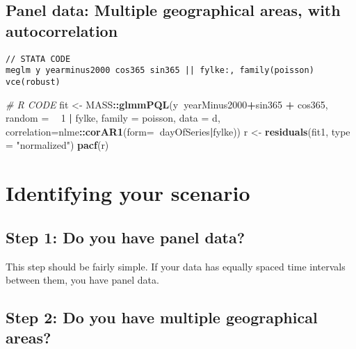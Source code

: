 \documentclass[]{book}
\newenvironment{Shaded}{\begin{snugshade}}{\end{snugshade}}
\newcommand{\KeywordTok}[1]{\textcolor[rgb]{0.13,0.29,0.53}{\textbf{#1}}}
\newcommand{\DataTypeTok}[1]{\textcolor[rgb]{0.13,0.29,0.53}{#1}}
\newcommand{\DecValTok}[1]{\textcolor[rgb]{0.00,0.00,0.81}{#1}}
\newcommand{\StringTok}[1]{\textcolor[rgb]{0.31,0.60,0.02}{#1}}
\newcommand{\CommentTok}[1]{\textcolor[rgb]{0.56,0.35,0.01}{\textit{#1}}}
\newcommand{\OperatorTok}[1]{\textcolor[rgb]{0.81,0.36,0.00}{\textbf{#1}}}
\newcommand{\NormalTok}[1]{#1}
\begin{document}
\subsection{Panel data: Multiple geographical areas, with
autocorrelation}\label{panel-data-multiple-geographical-areas-with-autocorrelation}

\begin{verbatim}
// STATA CODE
meglm y yearminus2000 cos365 sin365 || fylke:, family(poisson) vce(robust)
\end{verbatim}

\begin{Shaded}
\begin{Highlighting}[]
\CommentTok{# R CODE}
\NormalTok{fit <-}\StringTok{ }\NormalTok{MASS}\OperatorTok{::}\KeywordTok{glmmPQL}\NormalTok{(y}\OperatorTok{~}\NormalTok{yearMinus2000}\OperatorTok{+}\NormalTok{sin365 }\OperatorTok{+}\StringTok{ }\NormalTok{cos365, }\DataTypeTok{random =} \OperatorTok{~}\StringTok{ }\DecValTok{1} \OperatorTok{|}\StringTok{ }\NormalTok{fylke,}
                \DataTypeTok{family =}\NormalTok{ poisson, }\DataTypeTok{data =}\NormalTok{ d,}
                \DataTypeTok{correlation=}\NormalTok{nlme}\OperatorTok{::}\KeywordTok{corAR1}\NormalTok{(}\DataTypeTok{form=}\OperatorTok{~}\NormalTok{dayOfSeries}\OperatorTok{|}\NormalTok{fylke))}
\NormalTok{r <-}\StringTok{ }\KeywordTok{residuals}\NormalTok{(fit1, }\DataTypeTok{type =} \StringTok{"normalized"}\NormalTok{)}
\KeywordTok{pacf}\NormalTok{(r)}
\end{Highlighting}
\end{Shaded}

\newpage

\section{Identifying your scenario}\label{identifying-your-scenario}

\subsection{Step 1: Do you have panel
data?}\label{step-1-do-you-have-panel-data}

This step should be fairly simple. If your data has equally spaced time
intervals between them, you have panel data.

\subsection{Step 2: Do you have multiple geographical
areas?}\label{step-2-do-you-have-multiple-geographical-areas}
\end{document}
